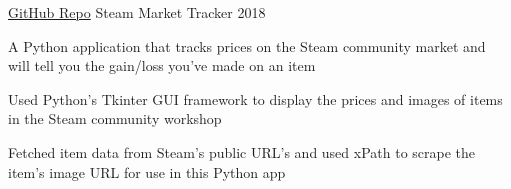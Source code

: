 

\begin{cventries}

  \cventry
    {\faGithubSquare\acvHeaderIconSep\href{https://github.com/pjsanjuan/SteamMarketTracker-Python}{GitHub Repo}} %
    {Steam Market Tracker} %
    {} %
    {2018} %
    {
      \begin{cvitems} %
        \item {A Python application that tracks prices on the Steam community market and will tell you the gain/loss you've made on an item}
        \item {Used Python's Tkinter GUI framework to display the prices and images of items in the Steam community workshop}
        \item {Fetched item data from Steam's public URL's and used xPath to scrape the item's image URL for use in this Python app}
      \end{cvitems}
    }
\end{cventries}
